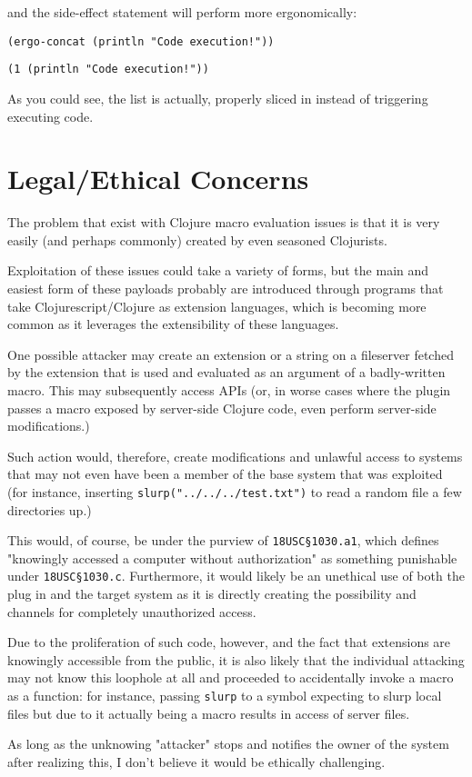 \documentclass[letterpaper]{article}
\begin{document}
and the side-effect statement will perform more ergonomically: 

\begin{verbatim}
(ergo-concat (println "Code execution!"))
\end{verbatim}

\begin{verbatim}
(1 (println "Code execution!"))
\end{verbatim}


As you could see, the list is actually, properly sliced in instead of triggering executing code.

\section{Legal/Ethical Concerns}
\label{sec:orgeb90623}
The problem that exist with Clojure macro evaluation issues is that it is very easily (and perhaps commonly) created by even seasoned Clojurists.

Exploitation of these issues could take a variety of forms, but the main and easiest form of these payloads probably are introduced through programs that take Clojurescript/Clojure as extension languages, which is becoming more common as it leverages the extensibility of these languages.

One possible attacker may create an extension or a string on a fileserver fetched by the extension that is used and evaluated as an argument of a badly-written macro. This may subsequently access APIs (or, in worse cases where the plugin passes a macro exposed by server-side Clojure code, even perform server-side modifications.)

Such action would, therefore, create modifications and unlawful access to systems that may not even have been a member of the base system that was exploited (for instance, inserting \texttt{slurp("../../../test.txt")} to read a random file a few directories up.)

This would, of course, be under the purview of \texttt{18USC§1030.a1}, which defines "knowingly accessed a computer without authorization" as something punishable under \texttt{18USC§1030.c}. Furthermore, it would likely be an unethical use of both the plug in and the target system as it is directly creating the possibility and channels for completely unauthorized access.

Due to the proliferation of such code, however, and the fact that extensions are knowingly accessible from the public, it is also likely that the individual attacking may not know this loophole at all and proceeded to accidentally invoke a macro as a function: for instance, passing \texttt{slurp} to a symbol expecting to slurp local files but due to it actually being a macro results in access of server files.

As long as the unknowing "attacker" stops and notifies the owner of the system after realizing this, I don't believe it would be ethically challenging.
\end{document}
